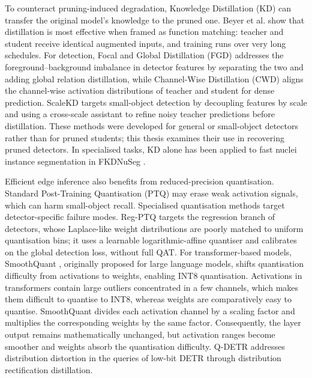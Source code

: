 To counteract pruning-induced degradation, Knowledge Distillation (KD) can transfer the original model's knowledge to the pruned one. Beyer et al. \cite{beyer2022knowledge} show that distillation is most effective when framed as function matching: teacher and student receive identical augmented inputs, and training runs over very long schedules. For detection, Focal and Global Distillation (FGD) \cite{yang2022focal} addresses the foreground--background imbalance in detector features by separating the two and adding global relation distillation, while Channel-Wise Distillation (CWD) \cite{shu2021channel} aligns the channel-wise activation distributions of teacher and student for dense prediction. ScaleKD \cite{zhu2023scalekd} targets small-object detection by decoupling features by scale and using a cross-scale assistant to refine noisy teacher predictions before distillation. These methods were developed for general or small-object detectors rather than for pruned students; this thesis examines their use in recovering pruned detectors. In specialised tasks, KD alone has been applied to fast nuclei instance segmentation in FKDNuSeg \cite{Zhao2026_FKDNuSeg}.

\begin{sloppypar}
Efficient edge inference also benefits from reduced-precision quantisation. Standard Post-Training Quantisation (PTQ) may erase weak activation signals, which can harm small-object recall. Specialised quantisation methods target detector-specific failure modes. Reg-PTQ \cite{ding2024regptq} targets the regression branch of detectors, whose Laplace-like weight distributions are poorly matched to uniform quantisation bins; it uses a learnable logarithmic-affine quantiser and calibrates on the global detection loss, without full QAT. For transformer-based models, SmoothQuant \cite{xiao2023smoothquant}, originally proposed for large language models, shifts quantisation difficulty from activations to weights, enabling INT8 quantisation. Activations in transformers contain large outliers concentrated in a few channels, which makes them difficult to quantise to INT8, whereas weights are comparatively easy to quantise. SmoothQuant divides each activation channel by a scaling factor and multiplies the corresponding weights by the same factor. Consequently, the layer output remains mathematically unchanged, but activation ranges become smoother and weights absorb the quantisation difficulty. Q-DETR \cite{xu2023qdetr} addresses distribution distortion in the queries of low-bit DETR through distribution rectification distillation.
\end{sloppypar}

